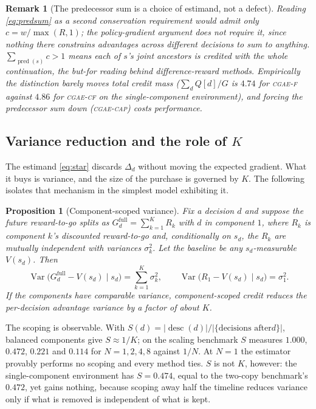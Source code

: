 \documentclass[review,authoryear,3p,times]{elsarticle}
\newtheorem{proposition}{Proposition}
\newtheorem{remark}{Remark}
\newcommand{\cflow}{\textsc{cgae-cf}}          %
\newcommand{\cflowraw}{\textsc{cgae-f}}        %
\newcommand{\ccap}{\textsc{cgae-cap}}          %
\newcommand{\Var}{\operatorname{Var}}
\newcommand{\desc}{\operatorname{desc}}
\newcommand{\pred}{\operatorname{pred}}
\begin{document}
\begin{remark}[The predecessor sum is a choice of estimand, not a defect]
\label{rem:p}
Reading \eqref{eq:predsum} as a second conservation requirement would admit
only $c=w/\max(R,1)$; the policy-gradient argument does not require it, since
nothing there constrains advantages across different decisions to sum to
anything. $\sum_{\pred(s)}c>1$ means each of $s$'s joint ancestors is credited
with the whole continuation, the but-for reading behind difference-reward
methods. Empirically the distinction barely moves total credit mass
($\sum_d Q[d]/G$ is $4.74$ for \cflowraw{} against $4.86$ for \cflow{} on the
single-component environment), and forcing the predecessor sum down (\ccap)
costs performance.
\end{remark}

\subsection{Variance reduction and the role of $K$}

The estimand \eqref{eq:star} discards $\Delta_d$ without moving the expected
gradient. What it buys is variance, and the size of the purchase is governed by
$K$. The following isolates that mechanism in the simplest model exhibiting it.

\begin{proposition}[Component-scoped variance]
\label{prop:k}
Fix a decision $d$ and suppose the future reward-to-go splits as
$G_d^{\mathrm{full}}=\sum_{k=1}^{K}R_k$ with $d$ in component $1$, where $R_k$ is
component $k$'s discounted reward-to-go and, conditionally on $s_d$, the $R_k$
are mutually independent with variances $\sigma_k^2$. Let the baseline be any
$s_d$-measurable $V(s_d)$. Then
\[
  \Var\bigl(G_d^{\mathrm{full}}-V(s_d)\mid s_d\bigr)=\sum_{k=1}^{K}\sigma_k^2,
  \qquad
  \Var\bigl(R_1-V(s_d)\mid s_d\bigr)=\sigma_1^2 .
\]
If the components have comparable variance, component-scoped credit reduces
the per-decision advantage variance by a factor of about $K$.
\end{proposition}

The scoping is observable. With $S(d)=|\desc(d)|/|\{\text{decisions after
}d\}|$, balanced components give $S\approx1/K$; on the scaling benchmark $S$
measures $1.000$, $0.472$, $0.221$ and $0.114$ for $N=1,2,4,8$ against $1/N$.
At $N=1$ the estimator provably performs no scoping and every method ties. $S$
is not $K$, however: the single-component environment has $S=0.474$, equal to
the two-copy benchmark's $0.472$, yet gains nothing, because scoping away half
the timeline reduces variance only if what is removed is independent of what is
kept.
\end{document}
